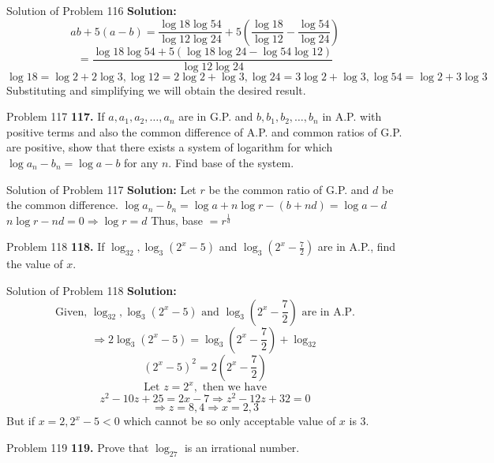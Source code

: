 \documentclass[aspectratio=169,8pt]{beamer}
\begin{document}
\begin{frame}{Solution of Problem 116}
  \textbf{Solution:} $$ab + 5(a - b) = \frac{\log 18\log 54}{\log 12\log 24} + 5\left(\frac{\log 18}{\log 12} - \frac{\log 54}{\log 24}\right)$$
  $$= \frac{\log 18\log 54 + 5(\log 18\log 24 - \log 54\log 12)}{\log 12\log 24}$$
  $$\log 18 = \log 2 + 2\log 3, \log 12 = 2\log 2 + \log 3, \log 24 = 3\log 2 + \log 3, \log 54 = \log 2 + 3\log 3$$
  Substituting and simplifying we will obtain the desired result.
\end{frame}
\begin{frame}{Problem 117}
  \textbf{117.} If $a, a_1, a_2, \ldots, a_n$ are in G.P. and $b, b_1, b_2, \ldots, b_n$ in A.P. with positive terms and also the common difference of A.P. and common ratios of G.P. are positive, show that there exists a system of logarithm for which $\log a_n - b_n = \log a - b$ for any $n.$ Find base of the system.
\end{frame}
\begin{frame}{Solution of Problem 117}
  \textbf{Solution:} Let $r$ be the common ratio of G.P. and $d$ be the common difference.
  \linebreak\linebreak
  $\log a_n - b_n = \log a + n\log r - (b + nd) = \log a - d$
  \linebreak\linebreak
  $n\log r - nd = 0 \Rightarrow \log r = d$
  \linebreak\linebreak
  Thus, base $= r^{\frac{1}{d}}$
\end{frame}
\begin{frame}{Problem 118}
  \textbf{118.} If $\log_32, \log_3(2^x - 5)$ and $\log_3\left(2^x - \frac{7}{2}\right)$ are in A.P., find the value of $x.$
\end{frame}
\begin{frame}{Solution of Problem 118}
  \textbf{Solution:} $$\text{Given,~}\log_32, \log_3(2^x - 5) \text{~and~} \log_3\left(2^x - \frac{7}{2}\right) \text{~are in A.P.}$$
  $$\Rightarrow 2\log_3(2^x - 5) = \log_3\left(2^x - \frac{7}{2}\right) + \log_32$$
  $$(2^x - 5)^2 = 2(2^x - \frac{7}{2})$$
  $$\text{Let~} z=2^x,\text{~then we have}$$
  $$z^2 - 10z + 25 = 2x - 7 \Rightarrow z^2 - 12z + 32 = 0$$
  $$\Rightarrow z = 8, 4 \Rightarrow x = 2, 3$$
  But if $x = 2, 2^x - 5 < 0$ which cannot be so only acceptable value of $x$ is $3.$
\end{frame}
\begin{frame}{Problem 119}
  \textbf{119.} Prove that $\log_27$ is an irrational number.
\end{frame}
\end{document}
